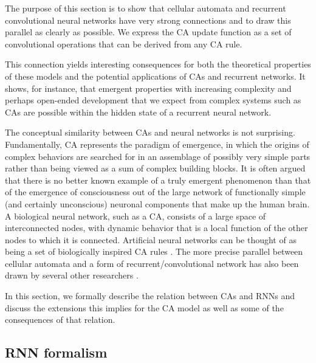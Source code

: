 The purpose of this section is to show that cellular automata and recurrent
convolutional neural networks have very strong connections and to draw this
parallel as clearly as possible. We express the \ac{CA} update function as a set
of convolutional operations that can be derived from any \ac{CA} rule.

This connection yields interesting consequences for both the theoretical
properties of these models and the potential applications of \acp{CA} and
recurrent networks. It shows, for instance, that emergent properties with
increasing complexity and perhaps open-ended development that we expect from
complex systems such as \acp{CA} are possible within the hidden state of a
recurrent neural network.

The conceptual similarity between \acp{CA} and neural networks is not surprising. 
Fundamentally, \ac{CA} represents the paradigm of emergence, in which
the origins of complex behaviors are searched for in an assemblage of possibly
very simple parts rather than being viewed as a sum of complex building blocks. It is
often argued that there is no better known example of a truly emergent
phenomenon than that of the emergence of consciousness out of the large network
of functionally simple (and certainly unconscious) neuronal components that make
up the human brain. A biological neural network, such as a \ac{CA}, consists of a
large space of interconnected nodes, with dynamic behavior that is a local
function of the other nodes to which it is connected. Artificial neural networks can
be thought of as being a set of biologically inspired CA rules
\parencite{ilachinskiCellularAutomataDiscrete2001}. The more precise parallel
between cellular automata and a form of recurrent/convolutional network has also
been drawn by several other researchers
\parencite{wulffLearningCellularAutomaton1993,
  gilpinCellularAutomataConvolutional2018,
  mordvintsevGrowingNeuralCellular2020}.

In this section, we formally describe the relation between \acp{CA} and \acp{RNN}
and discuss the extensions this implies for the \ac{CA} model as well as some of
the consequences of that relation.

\subsection{RNN formalism}

